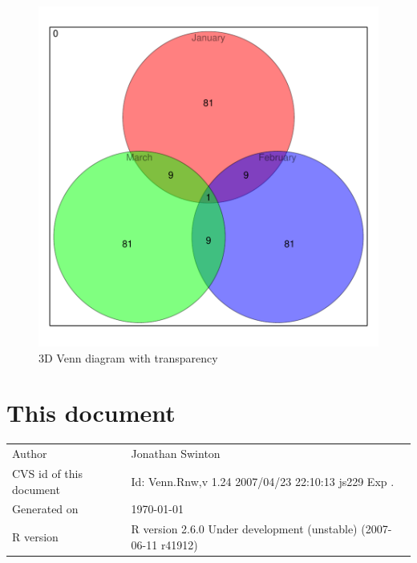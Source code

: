 \documentclass[a4paper]{article}
\begin{document}
\begin{figure}[H]
  \begin{center}
\includegraphics{Vennfig-p3utransp}
  \caption{ 3D Venn diagram with transparency}
  \end{center}
\end{figure}




\section{This document}

\begin{tabular}{|l|l|}
\hline
Author & Jonathan Swinton
\\
CVS id of this document & ${}$Id: Venn.Rnw,v 1.24 2007/04/23 22:10:13 js229 Exp ${}$.
\\
Generated on & \today
\\
R version & 
R version 2.6.0 Under development (unstable) (2007-06-11 r41912)\\
\hline
\end{tabular}



\end{document}
